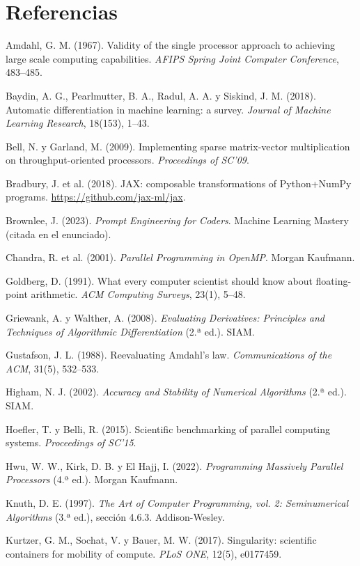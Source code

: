 \section*{Referencias}
{\small
\begin{enumerate}[leftmargin=*,label={[\arabic*]}]
\item Amdahl, G. M. (1967). Validity of the single processor approach to achieving large scale computing capabilities. \emph{AFIPS Spring Joint Computer Conference}, 483--485.
\item Baydin, A. G., Pearlmutter, B. A., Radul, A. A. y Siskind, J. M. (2018). Automatic differentiation in machine learning: a survey. \emph{Journal of Machine Learning Research}, 18(153), 1--43.
\item Bell, N. y Garland, M. (2009). Implementing sparse matrix-vector multiplication on throughput-oriented processors. \emph{Proceedings of SC'09}.
\item Bradbury, J. et al. (2018). JAX: composable transformations of Python+NumPy programs. \url{https://github.com/jax-ml/jax}.
\item Brownlee, J. (2023). \emph{Prompt Engineering for Coders}. Machine Learning Mastery (citada en el enunciado).
\item Chandra, R. et al. (2001). \emph{Parallel Programming in OpenMP}. Morgan Kaufmann.
\item Goldberg, D. (1991). What every computer scientist should know about floating-point arithmetic. \emph{ACM Computing Surveys}, 23(1), 5--48.
\item Griewank, A. y Walther, A. (2008). \emph{Evaluating Derivatives: Principles and Techniques of Algorithmic Differentiation} (2.ª ed.). SIAM.
\item Gustafson, J. L. (1988). Reevaluating Amdahl's law. \emph{Communications of the ACM}, 31(5), 532--533.
\item Higham, N. J. (2002). \emph{Accuracy and Stability of Numerical Algorithms} (2.ª ed.). SIAM.
\item Hoefler, T. y Belli, R. (2015). Scientific benchmarking of parallel computing systems. \emph{Proceedings of SC'15}.
\item Hwu, W. W., Kirk, D. B. y El Hajj, I. (2022). \emph{Programming Massively Parallel Processors} (4.ª ed.). Morgan Kaufmann.
\item Knuth, D. E. (1997). \emph{The Art of Computer Programming, vol. 2: Seminumerical Algorithms} (3.ª ed.), sección 4.6.3. Addison-Wesley.
\item Kurtzer, G. M., Sochat, V. y Bauer, M. W. (2017). Singularity: scientific containers for mobility of compute. \emph{PLoS ONE}, 12(5), e0177459.

\end{enumerate}}
